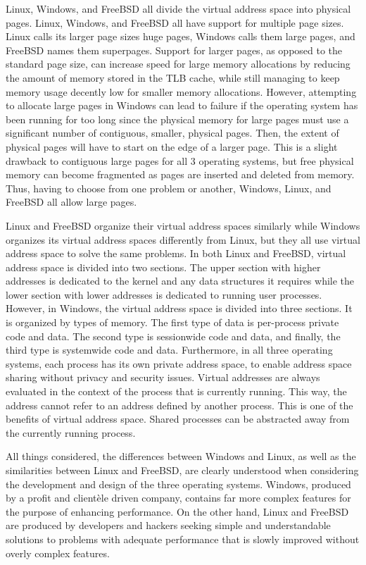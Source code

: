 \documentclass[letterpaper,10pt,onecolumn,draftclsnofoot,]{article}
\begin{document}
Linux, Windows, and FreeBSD all divide the virtual address space into physical pages. Linux, Windows, and FreeBSD all have support for multiple page sizes. Linux calls its larger page sizes huge pages, Windows calls them large pages, and FreeBSD names them superpages. Support for larger pages, as opposed to the standard page size, can increase speed for large memory allocations by reducing the amount of memory stored in the TLB cache, while still managing to keep memory usage decently low for smaller memory allocations. However, attempting to allocate large pages in Windows can lead to failure if the operating system has been running for too long since the physical memory for large pages must use a significant number of contiguous, smaller, physical pages. Then, the extent of physical pages will have to start on the edge of a larger page. This is a slight drawback to contiguous large pages for all 3 operating systems, but free physical memory can become fragmented as pages are inserted and deleted from memory. Thus, having to choose from one problem or another, Windows, Linux, and FreeBSD all allow large pages.

Linux and FreeBSD organize their virtual address spaces similarly while Windows organizes its virtual address spaces differently from Linux, but they all use virtual address space to solve the same problems. In both Linux and FreeBSD, virtual address space is divided into two sections. The upper section with higher addresses is dedicated to the kernel and any data structures it requires while the lower section with lower addresses is dedicated to running user processes. However, in Windows, the virtual address space is divided into three sections. It is organized by types of memory. The first type of data is per-process private code and data. The second type is sessionwide code and data, and finally, the third type is systemwide code and data. Furthermore, in all three operating systems, each process has its own private address space, to enable address space sharing without privacy and security issues. Virtual addresses are always evaluated in the context of the process that is currently running. This way, the address cannot refer to an address defined by another process. This is one of the benefits of virtual address space. Shared processes can be abstracted away from the currently running process.

All things considered, the differences between Windows and Linux, as well as the similarities between Linux and FreeBSD, are clearly understood when considering the development and design of the three operating systems. Windows, produced by a profit and clientèle driven company, contains far more complex features for the purpose of enhancing performance. On the other hand, Linux and FreeBSD are produced by developers and hackers seeking simple and understandable solutions to problems with adequate performance that is slowly improved without overly complex features.
\end{document}
